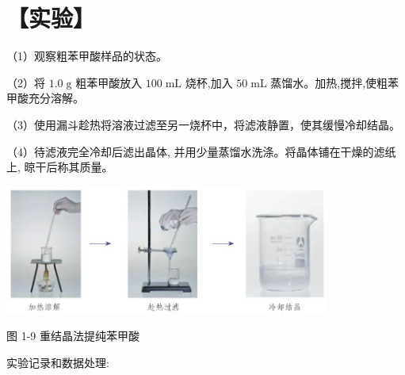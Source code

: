 \documentclass[10pt]{article}
\begin{document}
\section*{【实验】}

（1）观察粗苯甲酸样品的状态。

（2）将 \({1.0}\mathrm{\;g}\) 粗苯甲酸放入 \({100}\mathrm{\;{mL}}\) 烧杯,加入 \({50}\mathrm{\;{mL}}\) 蒸馏水。加热,搅拌,使粗苯甲酸充分溶解。

（3）使用漏斗趁热将溶液过滤至另一烧杯中，将滤液静置，使其缓慢冷却结晶。

（4）待滤液完全冷却后滤出晶体, 并用少量蒸馏水洗涤。将晶体铺在干燥的滤纸上, 晾干后称其质量。

\begin{center}
\includegraphics[max width=0.8\textwidth]{images/0190efc5-b58a-7c43-bfb0-e0a030df9cfd_20_483460.jpg}
\end{center}

图 1-9 重结晶法提纯苯甲酸

实验记录和数据处理:

\begin{center}
\end{center}
\end{document}

